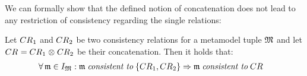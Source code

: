 



We can formally show that the defined notion of concatenation does not lead to any restriction of consistency regarding the single relations:

\begin{lemma} \label{lemma:concatenationimpliesconsistency}
    Let $\consistencyrelation{CR}{1}$ and $\consistencyrelation{CR}{2}$ be two consistency relations for a metamodel tuple $\metamodeltuple{M}$ and let $\consistencyrelation{CR}{} = \consistencyrelation{CR}{1} \concat \consistencyrelation{CR}{2}$ be their concatenation. Then it holds that:
    \begin{align*}
        &
        \forall \modeltuple{m} \in \metamodeltupleinstanceset{M}: \modeltuple{m} \consistenttomath \setted{\consistencyrelation{CR}{1}, \consistencyrelation{CR}{2}} \Rightarrow \modeltuple{m} \consistenttomath \consistencyrelation{CR}{}
    \end{align*}
\end{lemma}


